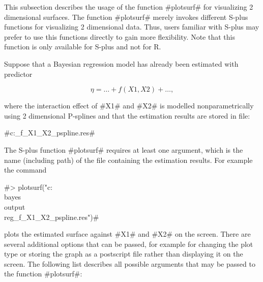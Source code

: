 This subsection describes the usage of the function #plotsurf# for
visualizing 2 dimensional surfaces. The function #plotsurf# merely
invokes different S-plus functions for visualizing 2 dimensional
data. Thus, users familiar with S-plus may prefer to use this
functions directly to gain more flexibility. Note that this
function is only available for S-plus and not for R.

Suppose that a Bayesian regression model has already been
estimated with predictor

$$
\eta = \dots + f(X1,X2) + \dots,
$$

where the interaction effect of #X1# and #X2# is modelled
nonparametrically using 2 dimensional P-splines and that the
estimation results are stored in file:

#c:\bayes\output\reg_f_X1_X2_pspline.res#

The S-plus function #plotsurf# requires at least one argument,
which is the name (including path) of the file containing the
estimation results. For example the command

#> plotsurf("c:\\bayes\\output\\reg_f_X1_X2_pspline.res")#

plots the estimated surface against #X1# and #X2# on the screen.
There are several additional options that can be passed, for
example for changing the plot type or storing the graph as a
postscript file rather than displaying it on the screen. The
following list describes all possible arguments that may be passed
to the function #plotsurf#:

